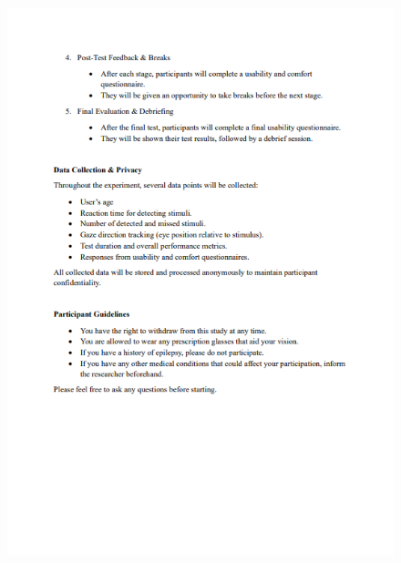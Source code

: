 \documentclass{l4proj}
\begin{document}
\begin{appendices}
\begin{figure}
    \centering
    \includegraphics[width=1\linewidth]{images//VFT study/p2.png}
\end{figure}
\clearpage


\end{appendices}
\end{document}
